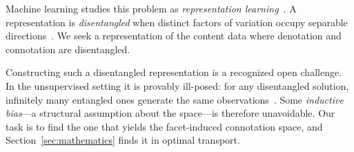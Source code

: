Machine learning studies this problem as \textit{representation
    learning}~\citep{Bengio20131798}. A representation is \textit{disentangled}
when distinct factors of variation occupy separable
directions~\citep{Higgins2017}. We seek a representation of the content data
where denotation and connotation are disentangled.

Constructing such a disentangled representation is a recognized open challenge.
In the unsupervised setting it is provably ill-posed: for any disentangled
solution, infinitely many entangled ones generate the same
observations~\citep{Locatello20197247}. Some \textit{inductive bias}---a
structural assumption about the space---is therefore unavoidable. Our task is to
find the one that yields the facet-induced connotation space, and
Section~\ref{sec:mathematics} finds it in optimal transport.
